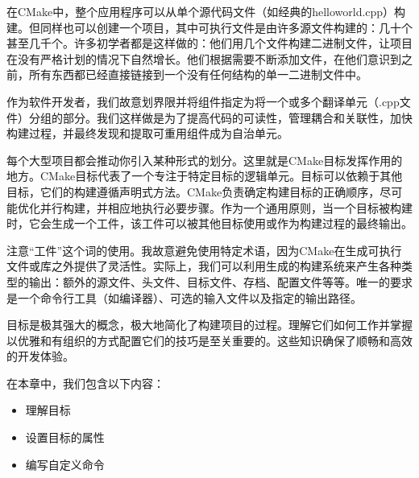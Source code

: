在CMake中，整个应用程序可以从单个源代码文件（如经典的helloworld.cpp）构建。但同样也可以创建一个项目，其中可执行文件是由许多源文件构建的：几十个甚至几千个。许多初学者都是这样做的：他们用几个文件构建二进制文件，让项目在没有严格计划的情况下自然增长。他们根据需要不断添加文件，在他们意识到之前，所有东西都已经直接链接到一个没有任何结构的单一二进制文件中。

作为软件开发者，我们故意划界限并将组件指定为将一个或多个翻译单元（.cpp文件）分组的部分。我们这样做是为了提高代码的可读性，管理耦合和关联性，加快构建过程，并最终发现和提取可重用组件成为自治单元。

每个大型项目都会推动你引入某种形式的划分。这里就是CMake目标发挥作用的地方。CMake目标代表了一个专注于特定目标的逻辑单元。目标可以依赖于其他目标，它们的构建遵循声明式方法。CMake负责确定构建目标的正确顺序，尽可能优化并行构建，并相应地执行必要步骤。作为一个通用原则，当一个目标被构建时，它会生成一个工件，该工件可以被其他目标使用或作为构建过程的最终输出。

注意“工件”这个词的使用。我故意避免使用特定术语，因为CMake在生成可执行文件或库之外提供了灵活性。实际上，我们可以利用生成的构建系统来产生各种类型的输出：额外的源文件、头文件、目标文件、存档、配置文件等等。唯一的要求是一个命令行工具（如编译器）、可选的输入文件以及指定的输出路径。

目标是极其强大的概念，极大地简化了构建项目的过程。理解它们如何工作并掌握以优雅和有组织的方式配置它们的技巧是至关重要的。这些知识确保了顺畅和高效的开发体验。

在本章中，我们包含以下内容：

\begin{itemize}
\item
理解目标

\item
设置目标的属性

\item
编写自定义命令
\end{itemize}















































